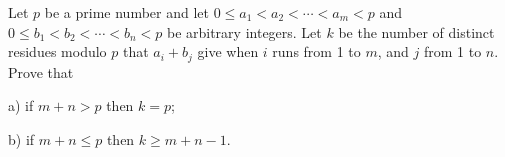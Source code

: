 Let $ p$ be a prime number and let $ 0\leq a_{1}< a_{2}<\cdots < a_{m}< p$ and $ 0\leq b_{1}< b_{2}<\cdots < b_{n}< p$ be arbitrary integers. Let $ k$ be the number of distinct residues modulo $ p$ that $ a_{i}+b_{j}$ give when $ i$ runs from 1 to $ m$, and $ j$ from 1 to $ n$. Prove that

a) if $ m+n > p$ then $ k = p$;

b) if $ m+n\leq p$ then $ k\geq m+n-1$.